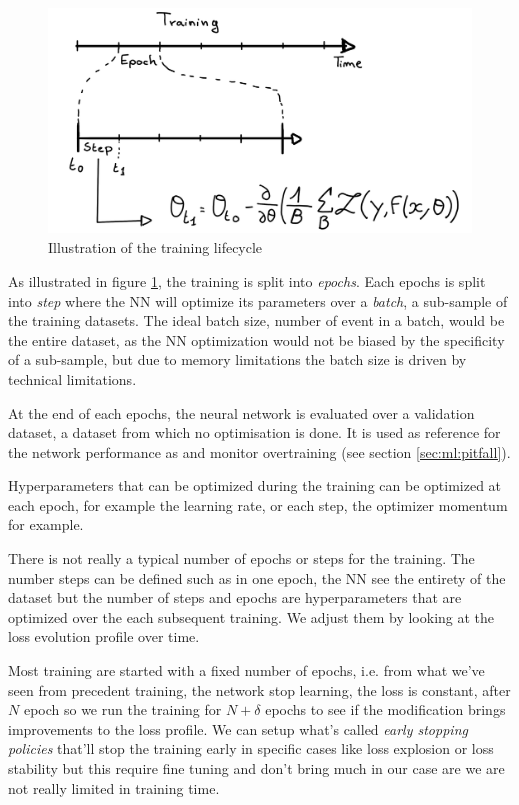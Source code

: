\documentclass[../main.tex]{subfiles}
\begin{document}
\begin{figure}[ht]
  \centering
  \includegraphics[height=6cm]{images/ml/lifecycle.jpg}
  \caption{Illustration of the training lifecycle}
  \label{fig:ml:lifecycle}
\end{figure}

As illustrated in figure \ref{fig:ml:lifecycle}, the training is split into \textit{epochs}. Each epochs is split into \textit{step} where the NN will optimize its parameters over a \textit{batch}, a sub-sample of the training datasets. The ideal batch size, number of event in a batch, would be the entire dataset, as the NN optimization would not be biased by the specificity of a sub-sample, but due to memory limitations the batch size is driven by technical limitations.

At the end of each epochs, the neural network is evaluated over a validation dataset, a dataset from which no optimisation is done. It is used as reference for the network performance as and monitor overtraining (see section \ref{sec:ml:pitfall}).

Hyperparameters that can be optimized during the training can be optimized at each epoch, for example the learning rate, or each step, the optimizer momentum for example.

There is not really a typical number of epochs or steps for the training. The number steps can be defined such as in one epoch, the NN see the entirety of the dataset but the number of steps and epochs are hyperparameters that are optimized over the each subsequent training. We adjust them by looking at the loss evolution profile over time.

Most training are started with a fixed number of epochs, i.e. from what we've seen from precedent training, the network stop learning, the loss is constant, after $N$ epoch so we run the training for $N+\delta$ epochs to see if the modification brings improvements to the loss profile. We can setup what's called \textit{early stopping policies} that'll stop the training early in specific cases like loss explosion or loss stability but this require fine tuning and don't bring much in our case are we are not really limited in training time.
\end{document}
